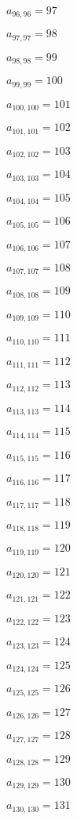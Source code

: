 \documentclass[a4paper,12pt]{article}
\begin{document}
$a _{ 96, 96 } = 97$

$a _{ 97, 97 } = 98$

$a _{ 98, 98 } = 99$

$a _{ 99, 99 } = 100$

$a _{ 100, 100 } = 101$

$a _{ 101, 101 } = 102$

$a _{ 102, 102 } = 103$

$a _{ 103, 103 } = 104$

$a _{ 104, 104 } = 105$

$a _{ 105, 105 } = 106$

$a _{ 106, 106 } = 107$

$a _{ 107, 107 } = 108$

$a _{ 108, 108 } = 109$

$a _{ 109, 109 } = 110$

$a _{ 110, 110 } = 111$

$a _{ 111, 111 } = 112$

$a _{ 112, 112 } = 113$

$a _{ 113, 113 } = 114$

$a _{ 114, 114 } = 115$

$a _{ 115, 115 } = 116$

$a _{ 116, 116 } = 117$

$a _{ 117, 117 } = 118$

$a _{ 118, 118 } = 119$

$a _{ 119, 119 } = 120$

$a _{ 120, 120 } = 121$

$a _{ 121, 121 } = 122$

$a _{ 122, 122 } = 123$

$a _{ 123, 123 } = 124$

$a _{ 124, 124 } = 125$

$a _{ 125, 125 } = 126$

$a _{ 126, 126 } = 127$

$a _{ 127, 127 } = 128$

$a _{ 128, 128 } = 129$

$a _{ 129, 129 } = 130$

$a _{ 130, 130 } = 131$
\end{document}

